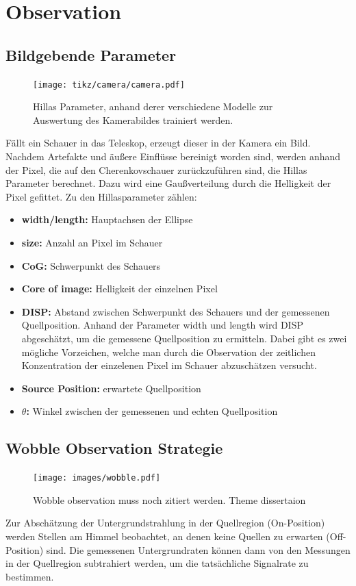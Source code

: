\chapter{Observation}
\section{Bildgebende Parameter}
\begin{figure}[H]
  \centering
  \texttt{[image: tikz/camera/camera.pdf]}
  \caption{Hillas Parameter, anhand derer verschiedene Modelle zur Auswertung des Kamerabildes trainiert werden.}
\end{figure}
Fällt ein Schauer in das Teleskop, erzeugt dieser in der Kamera ein Bild. 
Nachdem Artefakte und äußere Einflüsse bereinigt worden sind, werden anhand der Pixel, die auf den Cherenkovschauer zurückzuführen sind, die Hillas Parameter berechnet. 
Dazu wird eine Gaußverteilung durch die Helligkeit der Pixel gefittet. 
Zu den Hillasparameter zählen:
\begin{itemize}
  \item \textbf{width/length:} Hauptachsen der Ellipse
  \item \textbf{size:} Anzahl an Pixel im Schauer
  \item \textbf{CoG:} Schwerpunkt des Schauers
  \item \textbf{Core of image:} Helligkeit der einzelnen Pixel
  \item \textbf{DISP:} Abstand zwischen Schwerpunkt des Schauers und der gemessenen Quellposition. Anhand der Parameter width und length wird DISP abgeschätzt, um die gemessene Quellposition zu ermitteln. Dabei gibt es zwei mögliche Vorzeichen, welche man durch die Observation der zeitlichen Konzentration der einzelenen Pixel im Schauer abzuschätzen versucht.
  \item \textbf{Source Position:} erwartete Quellposition
  \item \textbf{$\theta$:} Winkel zwischen der gemessenen und echten Quellposition
\end{itemize}
\section{Wobble Observation Strategie}
\begin{figure}
  \texttt{[image: images/wobble.pdf]}
  \caption{Wobble observation muss noch zitiert werden. Theme dissertaion}
\end{figure}
Zur Abschätzung der Untergrundstrahlung in der Quellregion (On-Position) werden Stellen am Himmel beobachtet, an denen keine Quellen zu erwarten (Off-Position) sind.
Die gemessenen Untergrundraten können dann von den Messungen in der Quellregion subtrahiert werden, um die tatsächliche Signalrate zu bestimmen.

